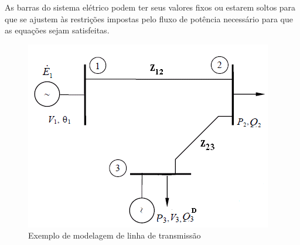 As barras do sistema elétrico podem ter seus valores fixos ou estarem
soltos para que se ajustem às restrições impostas pelo fluxo de potência
necessário para que as equações sejam satisfeitas. 

\begin{figure}
\begin{centering}
\includegraphics{anexos/aula3_barras}
\par\end{centering}



\protect\caption{\label{fig:modelagem-sistema-1}Exemplo de modelagem de linha de transmissão}
\end{figure}



